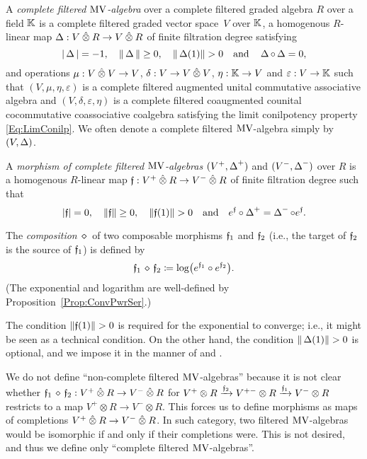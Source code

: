 \documentclass[\MainFolder/Text.tex]{subfiles}
\begin{document}
\begin{Definition}\label{Def:FilteredMV}
A \emph{complete filtered $\mathrm{MV}$-algebra} over a complete filtered graded algebra $R$ over a field $\mathbb{K}$ is a complete filtered graded vector space~$V$ over $\mathbb{K}$, a homogenous $R$-linear map $\BVOp: V\COtimes R \rightarrow V\COtimes R$ of finite filtration degree satisfying 
\[ \Abs{\BVOp} = -1, \quad \Norm{\BVOp}\ge 0,\quad\Norm{\BVOp(1)}>0 \quad\text{and}\quad\BVOp\circ \BVOp = 0,\]
and operations $\MVProd: V\COtimes V \rightarrow V$, $\MVCoProd: V \rightarrow V\COtimes V$, $\eta: \mathbb{K} \rightarrow V$ and $\varepsilon: V\rightarrow \mathbb{K}$ such that $(V,\mu,\eta,\varepsilon)$ is a complete filtered augmented unital commutative associative algebra and $(V,\delta,\varepsilon,\eta)$ is a complete filtered coaugmented counital cocommutative coassociative coalgebra satisfying the limit conilpotency property \eqref{Eq:LimConilp}. We often denote a complete filtered $\mathrm{MV}$-algebra simply by $(V,\operatorname{\Delta})$.

A \emph{morphism of complete filtered $\mathrm{MV}$-algebras} $(V^+,\operatorname{\Delta}^+)$ and $(V^-,\operatorname{\Delta}^-)$ over $R$ is a homogenous $R$-linear map $\MVMorF: V^+\COtimes R\rightarrow V^-\COtimes R$ of finite filtration degree such that 
\[ \Abs{\MVMorF} = 0,\quad \Norm{\MVMorF}\ge0, \quad \Norm{\MVMorF(1)}>0\quad\text{and}\quad e^{\MVMorF}\circ\BVOp^+ = \BVOp^- \circ e^\MVMorF. \]

The \emph{composition} $\DiamComp$ of two composable morphisms $\mathfrak{f}_1$ and $\mathfrak{f}_2$ (i.e., the target of $\mathfrak{f}_2$ is the source of $\mathfrak{f}_1$) is defined by
\begin{equation}\label{Eq:CompositionMV}
\MVMorF_1\DiamComp\MVMorF_2 \coloneqq \log(e^{\MVMorF_1}\circ e^{\MVMorF_2}).
\end{equation}
(The exponential and logarithm are well-defined by Proposition~\ref{Prop:ConvPwrSer}.)
\end{Definition}

\begin{Remark}\begin{RemarkList}
\item The condition $\Norm{\MVMorF(1)}>0$ is required for the exponential to converge; i.e., it might be seen as a technical condition. On the other hand, the condition $\Norm{\BVOp(1)}>0$ is optional, and we impose it in the manner of \cite{Markl2015} and \cite{Cieliebak2015}.
\item We do not define ``non-complete filtered $\mathrm{MV}$-algebras'' because it is not clear whether $\MVMorF_1\DiamComp\MVMorF_2: V^+\COtimes R \rightarrow V^-\COtimes R$ for $V^+\otimes R \xrightarrow{\mathfrak{f}_2} V^{+-}\otimes R \xrightarrow{\mathfrak{f}_1} V^-\otimes R$ restricts to a map $V^+\otimes R \rightarrow V^-\otimes R$. This forces us to define morphisms as maps of completions $V^+\COtimes R \rightarrow V^-\COtimes R$. In such category, two filtered $\mathrm{MV}$-algebras would be isomorphic if and only if their completions were. This is not desired, and thus we define only ``complete filtered $\mathrm{MV}$-algebras''.\qedhere
\end{RemarkList}\end{Remark}
\end{document}
